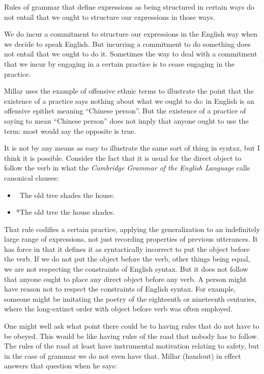 \documentclass[output=paper]{langscibook}
\begin{document}
Rules of grammar that define expressions as being structured in certain ways do not entail that we ought to structure our expressions in those ways.

We do incur a commitment to structure our expressions in the English way when we decide to speak English.  But incurring a commitment to do something does not entail that we ought to do it.  Sometimes the way to deal with a commitment that we incur by engaging in a certain practice is to cease engaging in the practice.

Millar uses the example of offensive ethnic terms to illustrate the point that the existence of a practice says nothing about what we ought to do:  in English is an offensive epithet meaning ``Chinese person''. But the existence of a practice of saying  to mean ``Chinese person'' does not imply that anyone ought to use the term: most would say the opposite is true.

It is not by any means as easy to illustrate the same sort of thing in syntax, but I think it is possible.  Consider the fact that it is usual for the direct object to follow the verb in what the \emph{Cambridge Grammar of the English Language} \citep{HuddlestonePullum2008} calls canonical clauses:

\begin{itemize}  
\item[] ~The old tree shades the house.  
\item[] *The old tree the house shades. 
\end{itemize} 

That rule codifies a certain practice, applying the generalization to an indefinitely large range of expressions, not just recording properties of previous utterances.  It has  force in that it defines it as syntactically incorrect to put the object before the verb.  If we do not put the object before the verb, other things being equal, we are not respecting the constraints of English syntax.  But it does not follow that anyone ought to place any direct object before any verb.  A person might have reason not to respect the constraints of English syntax.  For example, someone might be imitating the poetry of the eighteenth or nineteenth centuries, where the long-extinct order with object before verb was often employed.

One might well ask what point there could be to having rules that do not have to be obeyed.  This would be like having rules of the road that nobody has to follow.  The rules of the road at least have instrumental motivation relating to safety, but in the case of grammar we do not even have that.  Millar (handout) in effect answers that question when he says:
\end{document}
